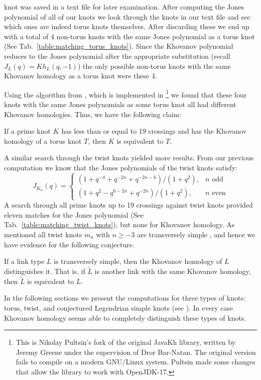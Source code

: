knot was saved in a text file for later examination. After computing the Jones
polynomial of all of our knots we look through the knots in our text file and
see which ones are indeed torus knots themselves. After discarding these
we end up with a total of 4 non-torus knots with the same Jones polynomial as a
torus knot (See Tab.~\ref{table:matching_torus_knots}).
Since the Khovanov polynomial reduces to the Jones polynomial after the
appropriate substitution
(recall $J_{L}(q)=Kh_{L}(q,-1)$) the only possible non-torus knots with
the same Khovanov homology as a torus knot were these 4.
\par\hfill\par
Using the algorithm from \cite{BarNatan2006FASTKH}, which is implemented in
\cite{JavaKhv2}\footnote{
    This is Nikolay Pultsin's fork of the original JavaKh library, written by
    Jeremy Greene under the supervision of Dror Bar-Natan. The original version
    fails to compile on a modern GNU/Linux system. Pultsin made some changes
    that allow the library to work with OpenJDK-17.
}
we found that these four knots with the same Jones polynomials as some
torus knot all had different Khovanov homologies. Thus, we have the
following claim:
\begin{theorem}
    If a prime knot $K$ has less than or equal to 19 crossings and has
    the Khovanov homology of a torus knot $T$,
    then $K$ is equivalent to $T$.
\end{theorem}
A similar search through the twist knots yielded more results.
From our previous computation we know that the Jones polynomials of the twist
knots satisfy:
\begin{equation}
    J_{K_{n}}(q)=
    \begin{cases}
        (1+q^{-4}+q^{-2n}+q^{-2n-6})/(1+q^{2}),&n\textrm{ odd}\\
        (1+q^{2}-q^{6-2n}+q^{-2n})/(1+q^{2}),&n\textrm{ even}
    \end{cases}
\end{equation}
A search through all prime knots up to 19 crossings against twist knots
provided eleven matches for the Jones polynomial
(See Tab.~\ref{table:matching_twist_knots}), but
none for Khovanov homology. As mentioned all twist knots $m_{n}$ with
$n\geq{-3}$ are transversely simple
\cite{EtnyreEtAlLegendrianAndTransverseTwistKnots}, and hence we have evidence
for the following conjecture.
\begin{conjecture}
    If a link type $L$ is transversely simple, then the Khovanov
    homology of $L$ distinguishes it. That is, if $\tilde{L}$
    is another link with the same Khovanov homology, then $\tilde{L}$ is
    equivalent to $L$.
\end{conjecture}
In the following sections we present the computations for three types of knots:
torus, twist, and conjectured Legendrian simple knots
(see \cite{LegendrianKnotAtlas}). In every case Khovanov
homology seems able to completely distinguish these types of knots.
